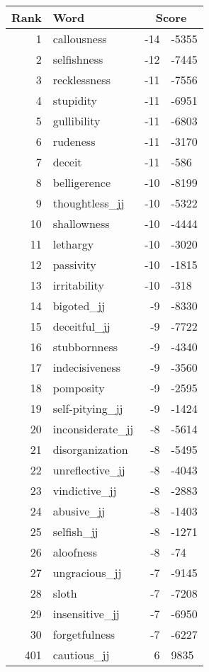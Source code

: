 \begin{longtable}[!htbp]{| rlr@{.}l |}
    \hline
    \textbf{Rank} & \textbf{Word} & \multicolumn{2}{c|}{\textbf{Score}} \\
    \hline
    \endhead
    1 & callousness & -14 & -5355 \\
    2 & selfishness & -12 & -7445 \\
    3 & recklessness & -11 & -7556 \\
    4 & stupidity & -11 & -6951 \\
    5 & gullibility & -11 & -6803 \\
    6 & rudeness & -11 & -3170 \\
    7 & deceit & -11 & -586 \\
    8 & belligerence & -10 & -8199 \\
    9 & thoughtless\_jj & -10 & -5322 \\
    10 & shallowness & -10 & -4444 \\
    11 & lethargy & -10 & -3020 \\
    12 & passivity & -10 & -1815 \\
    13 & irritability & -10 & -318 \\
    14 & bigoted\_jj & -9 & -8330 \\
    15 & deceitful\_jj & -9 & -7722 \\
    16 & stubbornness & -9 & -4340 \\
    17 & indecisiveness & -9 & -3560 \\
    18 & pomposity & -9 & -2595 \\
    19 & self-pitying\_jj & -9 & -1424 \\
    20 & inconsiderate\_jj & -8 & -5614 \\
    21 & disorganization & -8 & -5495 \\
    22 & unreflective\_jj & -8 & -4043 \\
    23 & vindictive\_jj & -8 & -2883 \\
    24 & abusive\_jj & -8 & -1403 \\
    25 & selfish\_jj & -8 & -1271 \\
    26 & aloofness & -8 & -74 \\
    27 & ungracious\_jj & -7 & -9145 \\
    28 & sloth & -7 & -7208 \\
    29 & insensitive\_jj & -7 & -6950 \\
    30 & forgetfulness & -7 & -6227 \\
    401 & cautious\_jj & 6 & 9835 \\

\end{longtable}
